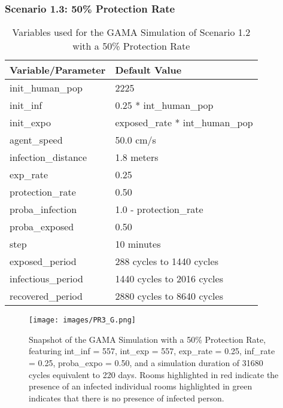 \subsubsection{ Scenario 1.3: 50\% Protection Rate}
\begin{table}[H]
	\centering
	{\begin{tabular}{ll}
			\toprule
			\textbf{Variable/Parameter} & \textbf{Default Value}\\
			\hline
			init\_human\_pop & 2225\\
			init\_inf & 0.25 * int\_human\_pop\\
			init\_expo & exposed\_rate * int\_human\_pop \\
			agent\_speed & 50.0 cm/s\\
			infection\_distance & 1.8 meters\\
			exp\_rate & 0.25\\
			protection\_rate & 0.50\\
			proba\_infection & 1.0 - protection\_rate\\
			proba\_exposed & 0.50\\
			step & 10 minutes\\
			exposed\_period & 288 cycles to 1440 cycles\\
			infectious\_period & 1440 cycles to 2016 cycles\\
			recovered\_period & 2880 cycles to 8640 cycles\\ 
			\bottomrule
		\end{tabular}
		\caption{Variables used for the GAMA Simulation of Scenario 1.2 with a 50\% Protection Rate}
		\label{1.3}}
\end{table}

 	\begin{figure}[H]
	\centering
	\texttt{[image: images/PR3\_G.png]}
	\caption{Snapshot of the GAMA Simulation with a 50\% Protection Rate, featuring int\_inf = 557, int\_exp = 557, exp\_rate = 0.25, inf\_rate = 0.25, proba\_expo = 0.50,  and a simulation duration of 31680 cycles equivalent to 220 days. Rooms highlighted in red indicate the presence of an infected individual rooms highlighted in green indicates that there is no presence of infected person.}
	\label{PR3G}
\end{figure}

